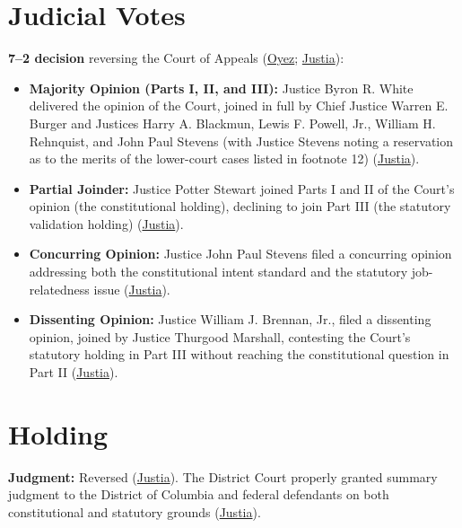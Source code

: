 \documentclass[12pt]{article}
\begin{document}
\section{Judicial Votes}

\textbf{7--2 decision} reversing the Court of Appeals (\href{https://www.oyez.org/cases/1975/74-1492}{Oyez}; \href{https://supreme.justia.com/cases/federal/us/426/229/}{Justia}):
\begin{itemize}
\item \textbf{Majority Opinion (Parts I, II, and III):} Justice Byron R. White delivered the opinion of the Court, joined in full by Chief Justice Warren E. Burger and Justices Harry A. Blackmun, Lewis F. Powell, Jr., William H. Rehnquist, and John Paul Stevens (with Justice Stevens noting a reservation as to the merits of the lower-court cases listed in footnote 12) (\href{https://supreme.justia.com/cases/federal/us/426/229/}{Justia}).
\item \textbf{Partial Joinder:} Justice Potter Stewart joined Parts I and II of the Court's opinion (the constitutional holding), declining to join Part III (the statutory validation holding) (\href{https://supreme.justia.com/cases/federal/us/426/229/}{Justia}).
\item \textbf{Concurring Opinion:} Justice John Paul Stevens filed a concurring opinion addressing both the constitutional intent standard and the statutory job-relatedness issue (\href{https://supreme.justia.com/cases/federal/us/426/229/}{Justia}).
\item \textbf{Dissenting Opinion:} Justice William J. Brennan, Jr., filed a dissenting opinion, joined by Justice Thurgood Marshall, contesting the Court's statutory holding in Part III without reaching the constitutional question in Part II (\href{https://supreme.justia.com/cases/federal/us/426/229/}{Justia}).
\end{itemize}

\section{Holding}

\textbf{Judgment:} Reversed (\href{https://supreme.justia.com/cases/federal/us/426/229/}{Justia}). The District Court properly granted summary judgment to the District of Columbia and federal defendants on both constitutional and statutory grounds (\href{https://supreme.justia.com/cases/federal/us/426/229/}{Justia}).
\end{document}
